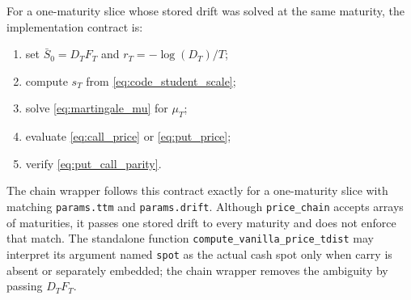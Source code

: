 \documentclass[11pt,a4paper]{article}
\begin{document}
For a one-maturity slice whose stored drift was solved at the same maturity,
the implementation contract is:
\begin{enumerate}
  \item set $\bar S_0=D_TF_T$ and
  $r_T=-\log(D_T)/T$;
  \item compute $s_T$ from \eqref{eq:code_student_scale};
  \item solve \eqref{eq:martingale_mu} for $\mu_T$;
  \item evaluate \eqref{eq:call_price} or \eqref{eq:put_price};
  \item verify \eqref{eq:put_call_parity}.
\end{enumerate}

The chain wrapper follows this contract exactly for a one-maturity slice with
matching \texttt{params.ttm} and \texttt{params.drift}.  Although
\texttt{price\_chain} accepts arrays of maturities, it passes one stored drift
to every maturity and does not enforce that match.  The standalone function
\texttt{compute\_vanilla\_price\_tdist} may interpret its argument named
\texttt{spot} as the actual cash spot only when carry is absent or separately
embedded; the chain wrapper removes the ambiguity by passing $D_TF_T$.
\end{document}
